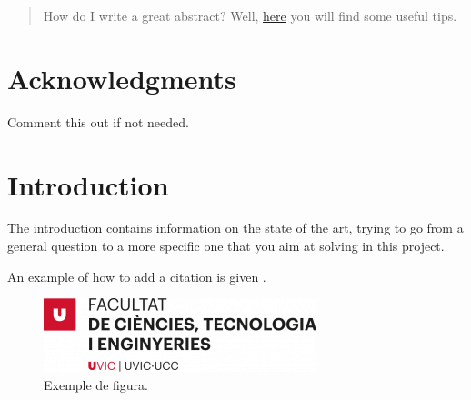 \documentclass[12pt,twoside]{article}
\date{June 2024}
\begin{document}



\clearpage{\pagestyle{empty}\cleardoublepage}
\setcounter{page}{1}
\pagestyle{fancy}

\begin{abstract}
How do I write a great abstract? Well, \href{https://www.aje.com/arc/make-great-first-impression-6-tips-writing-strong-abstract/?utm_term=&utm_campaign=AJE_Digital_Prosp_Display_EN&utm_source=adwords&utm_medium=ppc&hsa_acc=3768250728&hsa_cam=20934774130&hsa_grp=&hsa_ad=&hsa_src=x&hsa_tgt=&hsa_kw=&hsa_mt=&hsa_net=adwords&hsa_ver=3&gad_source=1&gclid=Cj0KCQjwncWvBhD_ARIsAEb2HW8VmH5upvCl-7VY_ZjuMa-adcPmbd3JwVzV3cyFXgkIjFxoJpRIYhoaAnutEALw_wcB}{here} you will find some useful tips\cite{noauthor_make_nodate}.

\end{abstract}

\clearpage
\section*{Acknowledgments}
Comment this out if not needed.

\clearpage{\pagestyle{empty}}

\tableofcontents 
\clearpage{\pagestyle{empty}}
\setcounter{page}{1}
\fancyhead[LE,RO]{\slshape \rightmark}
\fancyhead[LO,RE]{\slshape \leftmark}


\section{Introduction}

The introduction contains information on the state of the art, trying to go from a general question to a more specific one that you aim at solving in this project. 

An example of how to add a citation is given \cite{wood1984spelunking}.

\begin{figure}[tb]
\centering
\includegraphics[width = 0.4\hsize]{./figures/FCTE}
\caption{Exemple de figura.}
\label{fig:logo}
\end{figure}
\end{document}

